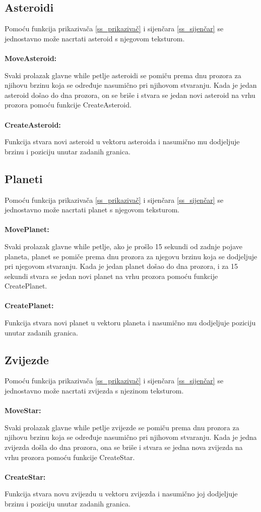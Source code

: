 \documentclass{mathos}
\begin{document}
\subsection{Asteroidi}
Pomoću  funkcija prikazivača \ref{ss_prikazivač} i sijenčara \ref{ss_sijenčar} se jednostavno može nacrtati asteroid s njegovom teksturom.
\\ \\
\textbf{MoveAsteroid: }

Svaki prolazak glavne while petlje asteroidi se pomiču prema dnu prozora za njihovu brzinu koja se određuje nasumično pri njihovom stvaranju. Kada je jedan asteroid došao do dna
prozora, on se briše i stvara se jedan novi asteroid na vrhu prozora pomoću funkcije CreateAsteroid.
\\ \\
\textbf{CreateAsteroid: }

Funkcija stvara novi asteroid u vektoru asteroida i nasumično mu dodjeljuje brzinu i poziciju unutar zadanih granica.

\subsection{Planeti}
Pomoću funkcija prikazivača \ref{ss_prikazivač} i sijenčara \ref{ss_sijenčar} se jednostavno može nacrtati planet s njegovom teksturom.
\\ \\
\textbf{MovePlanet: }

Svaki prolazak glavne while petlje, ako je prošlo 15 sekundi od zadnje pojave planeta, planet se pomiče prema dnu prozora za njegovu brzinu koja se dodjeljuje pri
njegovom stvaranju. Kada je jedan planet došao do dna prozora, i za 15 sekundi stvara se jedan novi planet na vrhu prozora pomoću funkcije CreatePlanet.
\\ \\
\textbf{CreatePlanet: }

Funkcija stvara novi planet u vektoru planeta i nasumično mu dodjeljuje poziciju unutar zadanih granica.

\subsection{Zvijezde}
Pomoću funkcija prikazivača \ref{ss_prikazivač} i sijenčara \ref{ss_sijenčar} se jednostavno može nacrtati zvijezda s njezinom teksturom.
\\ \\
\textbf{MoveStar: }

Svaki prolazak glavne while petlje zvijezde se pomiču prema dnu prozora za njihovu brzinu koja se određuje nasumično pri njihovom stvaranju. Kada je jedna zvijezda došla do dna
prozora, ona se briše i stvara se jedna nova zvijezda na vrhu prozora pomoću funkcije CreateStar.
\\ \\
\textbf{CreateStar: }

Funkcija stvara novu zvijezdu u vektoru zvijezda i nasumično joj dodjeljuje brzinu i poziciju unutar zadanih granica.
\end{document}
